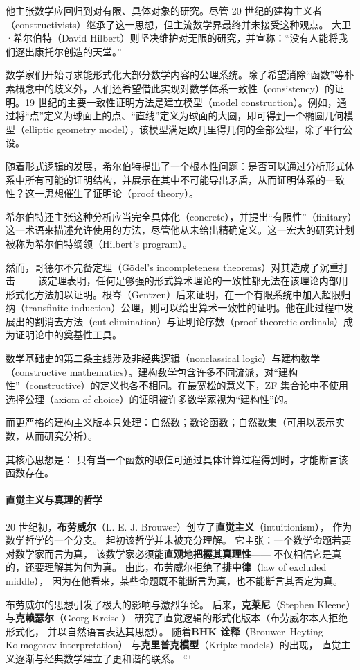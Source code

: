 他主张数学应回归到对有限、具体对象的研究。尽管 20 世纪的建构主义者（constructivists）继承了这一思想，但主流数学界最终并未接受这种观点。  
大卫·希尔伯特（David Hilbert）则坚决维护对无限的研究，并宣称：“没有人能将我们逐出康托尔创造的天堂。”

数学家们开始寻求能形式化大部分数学内容的公理系统。除了希望消除“函数”等朴素概念中的歧义外，人们还希望借此实现对数学体系一致性（consistency）的证明。19 世纪的主要一致性证明方法是建立模型（model construction）。例如，通过将“点”定义为球面上的点、“直线”定义为球面的大圆，即可得到一个椭圆几何模型（elliptic geometry model），该模型满足欧几里得几何的全部公理，除了平行公设。

随着形式逻辑的发展，希尔伯特提出了一个根本性问题：是否可以通过分析形式体系中所有可能的证明结构，并展示在其中不可能导出矛盾，从而证明体系的一致性？这一思想催生了证明论（proof theory）。  

希尔伯特还主张这种分析应当完全具体化（concrete），并提出“有限性”（finitary）这一术语来描述允许使用的方法，尽管他从未给出精确定义。这一宏大的研究计划被称为希尔伯特纲领（Hilbert’s program）。  

然而，哥德尔不完备定理（Gödel’s incompleteness theorems）对其造成了沉重打击—— 该定理表明，任何足够强的形式算术理论的一致性都无法在该理论内部用形式化方法加以证明。根岑（Gentzen）后来证明，在一个有限系统中加入超限归纳（transfinite induction）公理，则可以给出算术一致性的证明。他在此过程中发展出的割消去方法（cut elimination）与证明论序数（proof-theoretic ordinals）成为证明论中的奠基性工具。

数学基础史的第二条主线涉及非经典逻辑（nonclassical logic）与建构数学（constructive mathematics）。建构数学包含许多不同流派，对“建构性”（constructive）的定义也各不相同。在最宽松的意义下，ZF 集合论中不使用选择公理（axiom of choice）的证明被许多数学家视为“建构性”的。  

而更严格的建构主义版本只处理：自然数；数论函数；自然数集（可用以表示实数，从而研究分析）。

其核心思想是：  
只有当一个函数的取值可通过具体计算过程得到时，才能断言该函数存在。

\paragraph{直觉主义与真理的哲学}
20 世纪初，\textbf{布劳威尔}（L. E. J. Brouwer）创立了\textbf{直觉主义}（intuitionism），  
作为数学哲学的一个分支。  
起初该哲学并未被充分理解。  
它主张：一个数学命题若要对数学家而言为真，  
该数学家必须能\textbf{直观地把握其真理性}——  
不仅相信它是真的，还要理解其为何为真。  
由此，布劳威尔拒绝了\textbf{排中律}（law of excluded middle），  
因为在他看来，某些命题既不能断言为真，也不能断言其否定为真。  

布劳威尔的思想引发了极大的影响与激烈争论。  
后来，\textbf{克莱尼}（Stephen Kleene）与\textbf{克赖瑟尔}（Georg Kreisel）  
研究了直觉逻辑的形式化版本（布劳威尔本人拒绝形式化，  
并以自然语言表达其思想）。  
随着\textbf{BHK 诠释}（Brouwer–Heyting–Kolmogorov interpretation）  
与\textbf{克里普克模型}（Kripke models）的出现，  
直觉主义逐渐与经典数学建立了更和谐的联系。
```


